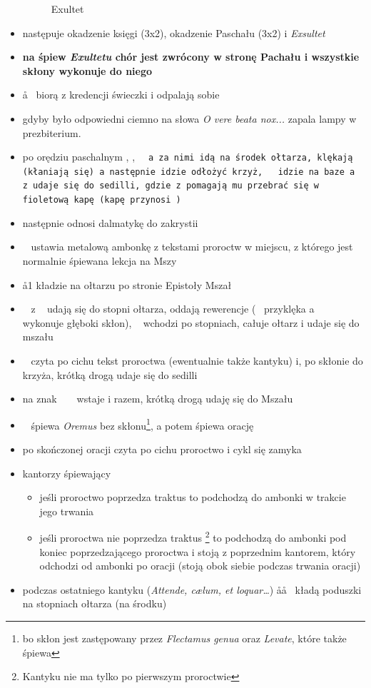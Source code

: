 \begin{itemize}
\begin{figure}[h!]
		      \caption{Exultet}
		      \label{fig:exultet}
	      \end{figure}
	\item następuje okadzenie księgi (3x2), okadzenie Paschału (3x2) i \textit{Exsultet}
	\item \textbf{na śpiew \textit{Exultetu} chór jest zwrócony w stronę Pachału i
		      wszystkie skłony wykonuje do niego}
	\item \aa~ biorą z kredencji świeczki i odpalają sobie
	\item gdyby było odpowiedni ciemno  na słowa \textit{O vere beata
		      nox...} zapala lampy w prezbiterium.
	\item po orędziu paschalnym \ii, , \tt~ a za nimi  idą na
	      środek ołtarza, klękają (kłaniają się) a następnie  idzie
	      odłożyć krzyż, \tt~ idzie na baze a \ii~ z  udaje się do sedilli,
	      gdzie  z  pomagają mu przebrać się w fioletową kapę (kapę
	      przynosi )
	\item następnie  odnosi dalmatykę do zakrystii
	\item \zz~ ustawia metalową ambonkę z tekstami proroctw w miejscu, z którego
	      jest normalnie śpiewana lekcja na Mszy
	\item \aa1 kładzie na ołtarzu po stronie Epistoły Mszał
	\item \ii~ z ~ udają się do stopni ołtarza, oddają rewerencje (~
	      przyklęka a \ii~ wykonuje głęboki skłon), \ii~ wchodzi po stopniach, całuje
	      ołtarz i udaje się do mszału
	\item \ii~ czyta po cichu tekst proroctwa (ewentualnie także kantyku) i, po
	      skłonie do krzyża, krótką drogą udaje się do sedilli
	\item na znak ~ \ii~ wstaje i razem, krótką drogą udaję się do Mszału
	\item \ii~ śpiewa \textit{Oremus} bez skłonu\footnote{bo skłon jest
		      zastępowany przez \textit{Flectamus genua} oraz \textit{Levate}, które także
		      śpiewa \ii}, a potem śpiewa orację
	\item po skończonej oracji czyta po cichu proroctwo i cykl się zamyka
	\item kantorzy śpiewający
	      \begin{itemize}
		      \item jeśli proroctwo poprzedza traktus to podchodzą do ambonki w
		            trakcie jego trwania
		      \item jeśli proroctwa nie poprzedza traktus \footnote{Kantyku nie
			            ma tylko po pierwszym proroctwie} to podchodzą do ambonki pod
		            koniec poprzedzającego proroctwa i stoją z poprzednim kantorem,
		            który odchodzi od ambonki po oracji (stoją obok siebie podczas
		            trwania oracji)
	      \end{itemize}
	\item podczas ostatniego kantyku (\textit{Attende, c\ae lum, et loquar\dots}) \aa\aa~ kładą
	      poduszki na stopniach ołtarza (na środku)
\end{itemize}